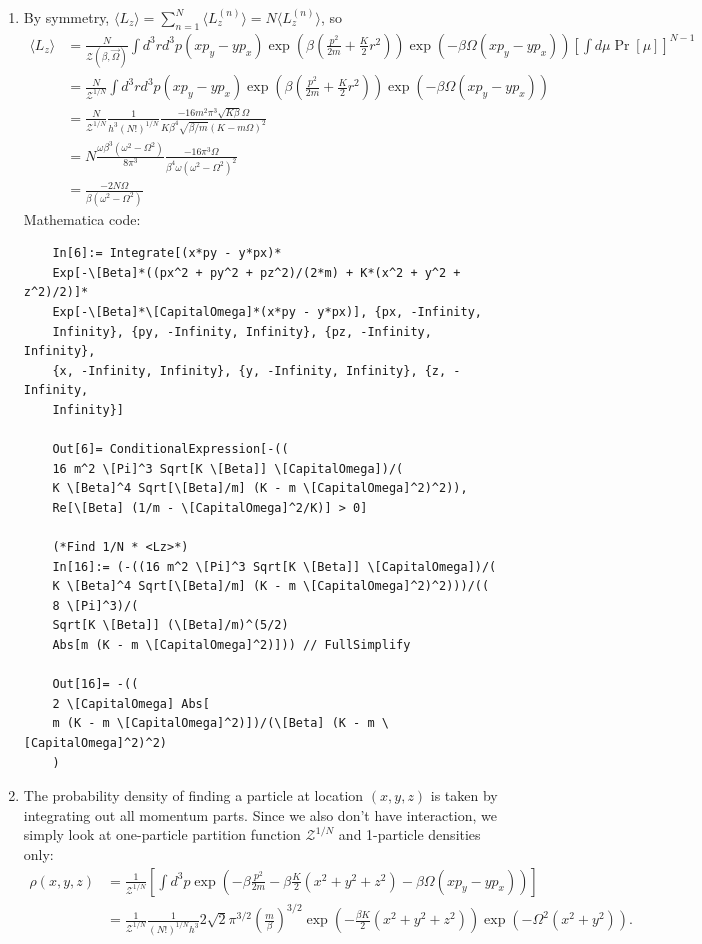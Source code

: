 \documentclass{article}
\theoremstyle{definition}
\newcommand{\be}{\beta}
\newcommand{\f}[2]{\frac{#1}{#2}}
\newcommand{\lp}{\left(}
\newcommand{\rp}{\right)}
\newcommand{\lb}{\left[}
\newcommand{\rb}{\right]}
\begin{document}
\begin{enumerate}[label=(\alph*)]
	\item By symmetry, $\langle L_z\rangle = \sum^N_{n=1}\langle L_z^{(n)}\rangle = N\langle L_z^{(n)}\rangle$, so 
	\begin{align*}
	\langle L_z \rangle 
	&= \f{N}{\mathcal{Z}(\be,\vec{\Omega})}\int d^3r d^3p (xp_y - yp_x)\exp\lp \beta \lp \f{p^2}{2m} + \f{K}{2}r^2 \rp \rp \exp\lp -\be\Omega(xp_y - y p_x)  \rp  \lb \int d\mu \Pr[\mu] \rb^{N-1}\\
	&= \f{N}{\mathcal{Z}^{1/N}} \int d^3r d^3p (xp_y - yp_x)\exp\lp \beta \lp \f{p^2}{2m} + \f{K}{2}r^2 \rp \rp \exp\lp -\be\Omega(xp_y - y p_x)  \rp \\
	&= \f{N}{\mathcal{Z}^{1/N}} \f{1}{h^3 (N!)^{1/N}} \f{-16m^2 \pi^3 \sqrt{K\be} \Omega}{K\be^4 \sqrt{\be/m} (K-m\Omega)^2}\\
	&= N \f{\omega \be^{3} (\omega^2 - \Omega^2)}{8\pi^3} \f{-16 \pi^3 \Omega}{ \be^4 \omega(\omega^2 - \Omega^2)^2} \\
	&=  \boxed{\f{-2N \Omega}{\be(\omega^2 - \Omega^2)}}
	\end{align*}
	Mathematica code:
	\begin{lstlisting}
	In[6]:= Integrate[(x*py - y*px)*
	Exp[-\[Beta]*((px^2 + py^2 + pz^2)/(2*m) + K*(x^2 + y^2 + z^2)/2)]*
	Exp[-\[Beta]*\[CapitalOmega]*(x*py - y*px)], {px, -Infinity, 
	Infinity}, {py, -Infinity, Infinity}, {pz, -Infinity, Infinity},
	{x, -Infinity, Infinity}, {y, -Infinity, Infinity}, {z, -Infinity, 
	Infinity}]
	
	Out[6]= ConditionalExpression[-((
	16 m^2 \[Pi]^3 Sqrt[K \[Beta]] \[CapitalOmega])/(
	K \[Beta]^4 Sqrt[\[Beta]/m] (K - m \[CapitalOmega]^2)^2)), 
	Re[\[Beta] (1/m - \[CapitalOmega]^2/K)] > 0]
	
	(*Find 1/N * <Lz>*)
	In[16]:= (-((16 m^2 \[Pi]^3 Sqrt[K \[Beta]] \[CapitalOmega])/(
	K \[Beta]^4 Sqrt[\[Beta]/m] (K - m \[CapitalOmega]^2)^2)))/((
	8 \[Pi]^3)/(
	Sqrt[K \[Beta]] (\[Beta]/m)^(5/2)
	Abs[m (K - m \[CapitalOmega]^2)])) // FullSimplify
	
	Out[16]= -((
	2 \[CapitalOmega] Abs[
	m (K - m \[CapitalOmega]^2)])/(\[Beta] (K - m \[CapitalOmega]^2)^2)
	)
	\end{lstlisting}
	
	\item The probability density of finding a particle at location $(x, y, z)$ is taken by integrating out all momentum parts. Since we also don't have interaction, we simply look at one-particle partition function $\mathcal{Z}^{1/N}$ and 1-particle densities only:
	\begin{align*}
	\rho(x,y,z) 
	&= \f{1}{\mathcal{Z}^{1/N}}\lb 
	\int d^3p \exp\lp -\be \f{p^2}{2m} -\be \f{K}{2}(x^2 + y^2 + z^2) - \be \Omega (xp_y - yp_x)\rp \rb\\
	&= \f{1}{\mathcal{Z}^{1/N}}  \f{1}{(N!)^{1/N}h^3} 2\sqrt{2} \pi^{3/2}\lp \f{m}{\be}\rp^{3/2}  \exp\lp -\f{ \be K}{2}(x^2+y^2+z^2) \rp \exp\lp -\Omega^2(x^2+y^2) \rp.
	\end{align*}
	

\end{enumerate}
\end{document}
